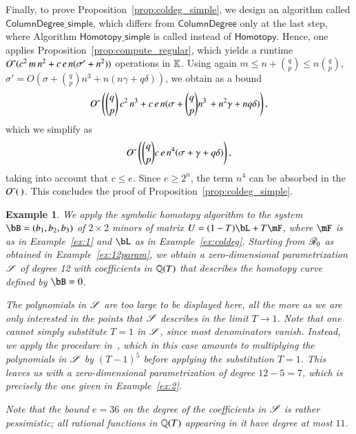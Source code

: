 \documentclass[amsthm]{elsart}
\newtheorem{example}[definition]{Example}
\begin{document}
Finally, to prove Proposition~\ref{prop:coldeg_simple}, we design an
algorithm called $\mathsf{ColumnDegree\_simple}$, which differs from
$\mathsf{ColumnDegree}$ only at the last step, where Algorithm
$\mathsf{Homotopy\_simple}$ is called instead of $\mathsf{Homotopy}$.
Hence, one applies Proposition~\ref{prop:compute_regular}, which yields a
runtime ${O}{\,\tilde{ }\,}(c^2\,m \,n^2  + c\,e\,n (\sigma'+n^2) )$ operations
in $\mathbb{K}$. Using again $m \leq n+ \binom{q}{p}\leq n\binom{q}{p}$,
$\sigma'=O(\sigma + {q \choose p} n^3 +n(n\gamma+q\delta))$, we
obtain as a bound
\[
  {O}{\,\tilde{ }\,}\left (
    {q \choose p}\, c^2\,n^3 +  c\, e\,n (\sigma+ {q \choose p}n^3 \, +n^2\gamma +nq \delta)
  \right ),
\]
which we simplify as
\[
 {O}{\,\tilde{ }\,}\left (   {q \choose p}c\, e\,n^4 (\sigma+\gamma+q\delta) \right ),
\]
taking into account that $c \le e$.
Since $e \ge 2^n$, the term $n^4$ can be absorbed in 
the ${O}{\,\tilde{ }\,}(\, )$.
This concludes the proof of Proposition~\ref{prop:coldeg_simple}. 

\begin{example}
  We apply the symbolic homotopy algorithm to the system
  $\bB=(b_1,b_2,b_3)$ of $2\times 2$ minors of matrix $\mU = (1-T) \bL
  + T\mF$, where $\mF$ is as in Example~\ref{ex:1} and $\bL$ as in
  Example~\ref{ex:coldeg}.  Starting from $\mathscr{R}_0$ as obtained in
  Example~\ref{ex:12param}, we obtain a zero-dimensional
  parametrization $\mathscr{S}$ of degree 12 with coefficients in $\mathbb{Q}(T)$
  that describes the homotopy curve defined by $\bB=0$.

  The polynomials in $\mathscr{S}$ are too large to be displayed here, all
  the more as we are only interested in the points that $\mathscr{S}$
  describes in the limit $T \to 1$. Note that one cannot simply
  substitute $T=1$ in $\mathscr{S}$, since most denominators vanish. Instead,
  we apply the procedure in~\cite{RRS}, which in this case amounts to
  multiplying the polynomials in $\mathscr{S}$ by $(T-1)^5$ before applying
  the substitution $T = 1$. This leaves us with a
  zero-dimensional parametrization of degree $12-5=7$, which is
  precisely the one given in Example~\ref{ex:2}.

  Note that the bound $e=36$ on the degree of the coefficients in
  $\mathscr{S}$ is rather pessimistic; all rational functions in $\mathbb{Q}(T)$
  appearing in it have degree at most $11$.
\end{example}


\end{document}
